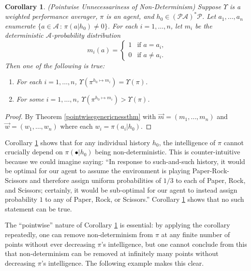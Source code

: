 \documentclass{article}
\newtheorem{corollary}[theorem]{Corollary}
\begin{document}
\begin{corollary}
\label{nondeterminismcorollary}
    (Pointwise Unnecessariness of Non-Determinism)
    Suppose $\Upsilon$ is a weighted performance averager, $\pi$ is an agent,
    and $h_0\in(\mathcal P\mathcal A)^*\mathcal P$.
    Let $a_1,\ldots,a_n$ enumerate $\{a\in\mathcal A\,:\,\pi(a|h_0)\not=0\}$.
    For each $i=1,\ldots,n$, let $m_i$ be the
    deterministic $\mathcal A$-probability distribution
    \[
        m_i(a) = \begin{cases}
            1 &\mbox{if $a=a_i$,}\\
            0 &\mbox{if $a\not=a_i$.}
        \end{cases}
    \]
    Then one of the following is true:
    \begin{enumerate}
        \item
        For each $i=1,\ldots,n$, $\Upsilon(\pi^{h_0\mapsto m_i})=\Upsilon(\pi)$.
        \item
        For some $i=1,\ldots,n$, $\Upsilon(\pi^{h_0\mapsto m_i})>\Upsilon(\pi)$.
    \end{enumerate}
\end{corollary}

\begin{proof}
    By Theorem \ref{pointwisegenericnessthm} with
    $\vec m=(m_1,\ldots,m_n)$ and $\vec w=(w_1,\ldots,w_n)$ where each
    $w_i=\pi(a_i|h_0)$.
\end{proof}

Corollary \ref{nondeterminismcorollary} shows that for any individual
history $h_0$, the intelligence of $\pi$ cannot crucially depend on $\pi(\bullet|h_0)$
being non-deterministic. This is counter-intuitive because we could imagine saying:
``In response to such-and-such history, it would be optimal for our agent
to assume the environment is playing Paper-Rock-Scissors and therefore
assign uniform probabilities of $1/3$ to each of Paper, Rock, and Scissors;
certainly, it would be sub-optimal for our agent to instead assign probability $1$ to
any of Paper, Rock, or Scissors.'' Corollary \ref{nondeterminismcorollary} shows
that no such statement can be true.

The ``pointwise'' nature of Corollary \ref{nondeterminismcorollary}
is essential: by applying the corollary repeatedly, one can remove non-determinism
from $\pi$ at any finite number of points without ever decreasing $\pi$'s intelligence,
but one cannot conclude from this that non-determinism can be removed at infinitely
many points without decreasing $\pi$'s intelligence. The following example makes this
clear.
\end{document}
